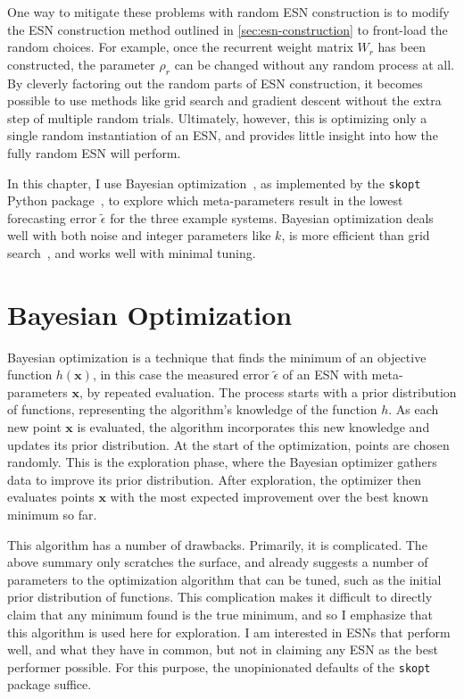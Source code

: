 One way to mitigate these problems with random ESN construction
is to modify the ESN construction method outlined in
\cref{sec:esn-construction} to front-load the random choices. For
example, once the recurrent weight matrix $W_r$ has been constructed,
the parameter $\rho_r$ can be changed without any random process at
all. By cleverly factoring out the random parts of ESN construction,
it becomes possible to use methods like grid search and gradient
descent without the extra step of multiple random trials. Ultimately,
however, this is optimizing only a single random instantiation of an
ESN, and provides little insight into how the fully random ESN will
perform.

In this chapter, I use Bayesian
optimization~\cite{yperman2016,maat2018}, as implemented by the
\texttt{skopt} Python package~\cite{skopt2018}, to explore which
meta-parameters result in the lowest forecasting error
$\tilde{\epsilon}$ for the three example systems. Bayesian
optimization deals well with both noise and integer parameters like
$k$, is more efficient than grid search~\cite{maat2018}, and works well
with minimal tuning.

\section{Bayesian Optimization}

Bayesian optimization is a technique that finds the
minimum of an objective function $h(\bm{x})$, in this case the
measured error $\tilde{\epsilon}$ of an ESN with meta-parameters
$\bm{x}$, by repeated evaluation. The process starts with a prior
distribution of functions, representing the algorithm's knowledge of
the function $h$. As each new point $\bm{x}$ is evaluated, the
algorithm incorporates this new knowledge and updates its prior
distribution. At the start of the optimization, points are chosen
randomly. This is the exploration phase, where the Bayesian optimizer
gathers data to improve its prior distribution. After
exploration, the optimizer then evaluates points $\bm{x}$ with the
most expected improvement over the best known minimum so far.

This algorithm has a number of drawbacks. Primarily, it is
complicated. The above summary only scratches the surface, and already
suggests a number of parameters to the optimization algorithm that can
be tuned, such as the initial prior distribution of functions. This
complication makes it difficult to directly claim that any minimum
found is the true minimum, and so I emphasize that this algorithm is
used here for exploration. I am interested in ESNs that perform well,
and what they have in common, but not in claiming any ESN as the best
performer possible. For this purpose, the unopinionated defaults of
the \texttt{skopt} package suffice.

